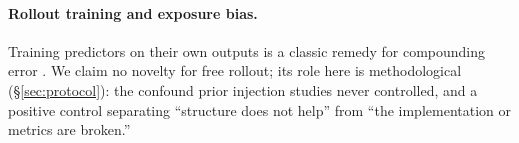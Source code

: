 \paragraph{Rollout training and exposure bias.}
Training predictors on their own outputs is a classic remedy for compounding error \citep{bengio2015scheduled,venkatraman2015improving,lamb2016professor}. We claim no novelty for free rollout; its role here is methodological (\S\ref{sec:protocol}): the confound prior injection studies never controlled, and a positive control separating ``structure does not help'' from ``the implementation or metrics are broken.''
